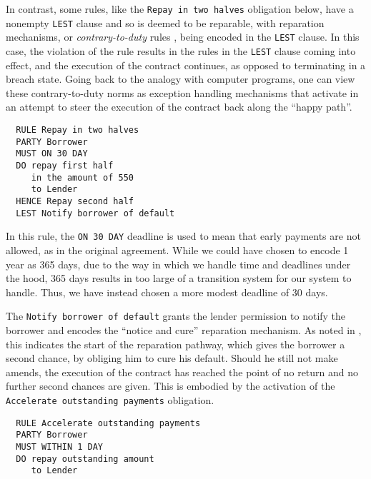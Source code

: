 \documentclass{article}
\begin{document}

In contrast, some rules, like the \texttt{Repay in two halves} obligation below,
have a nonempty \texttt{LEST} clause and so is deemed to be reparable, with
reparation mechanisms, or \textit{contrary-to-duty} rules
, being encoded in the
\texttt{LEST} clause.
In this case, the violation of the rule results in the rules in the
\texttt{LEST} clause coming into effect, and the execution of the contract
continues, as opposed to terminating in a breach state.
Going back to the analogy with computer programs, one can view these
contrary-to-duty norms as exception handling mechanisms that activate in an
attempt to steer the execution of the contract back along the ``happy path''.

\begin{lstlisting}
  RULE Repay in two halves
  PARTY	Borrower
  MUST ON 30 DAY
  DO repay first half
     in the amount of 550
     to Lender
  HENCE	Repay second half
  LEST Notify borrower of default
\end{lstlisting}

In this rule, the \texttt{ON 30 DAY} deadline is used to mean that early
payments are not allowed, as in the original agreement.
While we could have chosen to encode 1 year as 365 days, due to the way in which
we handle time and deadlines under the hood, 365 days results in too large of a
transition system for our system to handle.
Thus, we have instead chosen a more modest deadline of 30 days.

The \texttt{Notify borrower of default} grants the lender permission to notify
the borrower and encodes the ``notice and cure'' reparation mechanism.
As noted in \cite{contract_as_automaton}, this indicates the
start of the reparation pathway, which gives the borrower a second chance, by
obliging him to cure his default.
Should he still not make amends, the execution of the contract has reached the
point of no return and no further second chances are given.
This is embodied by the activation of the
\texttt{Accelerate outstanding payments} obligation.

\begin{lstlisting}
  RULE Accelerate outstanding payments			
  PARTY Borrower
  MUST WITHIN 1 DAY	
  DO repay outstanding amount
     to Lender	
\end{lstlisting}
\end{document}

